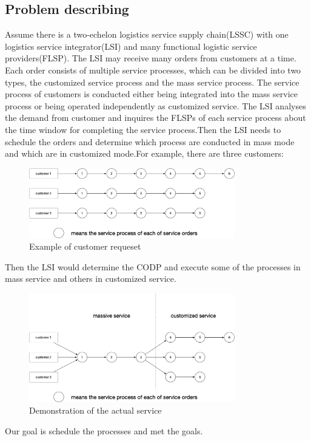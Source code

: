 \documentclass[12pt,a4paper]{article}
\begin{document}
\subsection{Problem describing}
Assume there is a two-echelon logistics service supply chain(LSSC) with one logistics service integrator(LSI) and many functional logistic service providers(FLSP). The LSI may receive many orders from customers at a time. Each order consists of multiple service processes, which can be divided into two types, the customized service process and the mass service process. The service process of customers is conducted either being integrated into the mass service process or being operated independently as customized service. The LSI analyses the demand from customer and inquires the FLSPs of each service process about the time window for completing the service process.Then the LSI needs to schedule the orders and determine which process are conducted in mass mode and which are in customized mode.For example, there are three customers:
\begin{figure}[h]
\centering
\includegraphics[width=0.8\textwidth]{figures/fig1.png}
\caption{Example of customer requeset}
\end{figure}
Then the LSI would determine the CODP and execute some of the processes in mass service and others in customized service.
\begin{figure}[htbp]
\centering
\includegraphics[width=0.8\textwidth]{figures/fig2.png}
\caption{Demonstration of the actual service}
\end{figure}
Our goal is schedule the processes and met the goals.
\newpage
\end{document}
